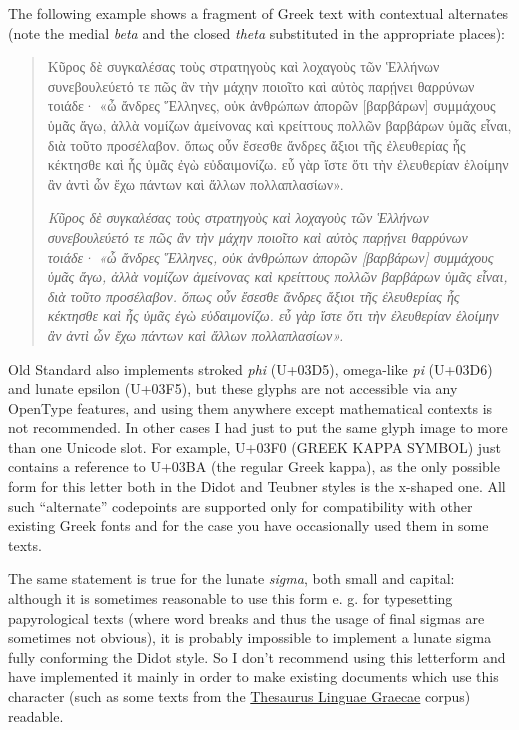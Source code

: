 \documentclass[12pt,a4paper,openany]{book}
\begin{document}
The following example shows a fragment of Greek text with contextual
alternates (note the medial \textit{beta} and the closed \textit{theta}
substituted in the appropriate places):

\begin{quote}
\large

Κῦρος δὲ συγκαλέσας τοὺς στρατηγοὺς καὶ λοχαγοὺς τῶν Ἑλλήνων συνεβουλεύετό
τε πῶς ἂν τὴν μάχην ποιοῖτο καὶ αὐτὸς παρῄνει θαρ\-ρύνων τοιάδε· «ὦ ἄνδρες
Ἕλληνες, οὐκ ἀνθρώπων ἀπορῶν [βαρβά\-ρων] συμ\-μάχους ὑμᾶς ἄγω, ἀλλὰ νομίζων
ἀμείνονας καὶ κρείττους πολλῶν βαρβάρων ὑμᾶς εἶναι, διὰ τοῦτο προσέλαβον.
ὅπως οὖν ἔσεσθε ἄνδρες ἄξιοι τῆς ἐλευθερίας ἧς κέκτησθε καὶ ἧς ὑμᾶς ἐγὼ
εὐδαιμονίζω. εὖ γὰρ ἴστε ὅτι τὴν ἐλευθερίαν ἑλοίμην ἂν ἀντὶ ὧν ἔχω πάντων
καὶ ἄλλων πολλαπλασίων».

\itshape
Κῦρος δὲ συγκαλέσας τοὺς στρατηγοὺς καὶ λοχαγοὺς τῶν Ἑλλήνων συνεβουλεύετό
τε πῶς ἂν τὴν μάχην ποιοῖτο καὶ αὐτὸς παρῄνει θαρ\-ρύνων τοιάδε· «ὦ ἄνδρες
Ἕλληνες, οὐκ ἀνθρώπων ἀπορῶν [βαρβά\-ρων] συμ\-μάχους ὑμᾶς ἄγω, ἀλλὰ νομίζων
ἀμείνονας καὶ κρείττους πολλῶν βαρβάρων ὑμᾶς εἶναι, διὰ τοῦτο προσέλαβον.
ὅπως οὖν ἔσεσθε ἄνδρες ἄξιοι τῆς ἐλευθερίας ἧς κέκτησθε καὶ ἧς ὑμᾶς ἐγὼ
εὐδαιμονίζω. εὖ γὰρ ἴστε ὅτι τὴν ἐλευθερίαν ἑλοίμην ἂν ἀντὶ ὧν ἔχω πάντων
καὶ ἄλλων πολλαπλασίων».

\end{quote}

Old Standard also implements stroked \textit{phi} (U+03D5), omega-like
\textit{pi} (U+03D6) and lunate epsilon (U+03F5), but these glyphs are not
accessible via any OpenType features, and using them anywhere except
mathematical contexts is not recommended. In other cases I had just to put
the same glyph image to more than one Unicode slot.  For example, U+03F0
(GREEK KAPPA SYMBOL) just contains a reference to U+03BA (the regular Greek
kappa), as the only possible form for this letter both in the Didot and
Teubner styles is the x-shaped one. All such “alternate” codepoints are
supported only for compatibility with other existing Greek fonts and for
the case you have occasionally used them in some texts.

The same statement is true for the lunate \textit{sigma}, both small and
capital: although it is sometimes reasonable to use this form e. g. for 
typesetting papyrological texts (where word breaks and thus the usage of
final sigmas are sometimes not obvious), it is probably impossible to 
implement a lunate sigma fully conforming the Didot style. So I don't
recommend using this letterform and have implemented it mainly in order
to make existing documents which use this character (such as some texts 
from the \href{http://www.tlg.uci.edu}{Thesaurus Linguae Graecae} corpus)
readable.
\end{document}
